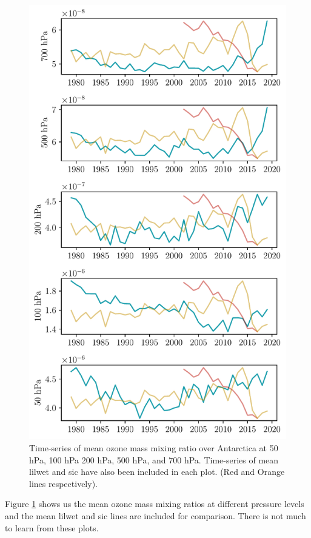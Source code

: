 \documentclass[../main.tex]{subfiles}
\begin{document}
\begin{figure}[hbt!]
    \centering
    \includegraphics{images/T2/timeseries_subplots/hres/ozone}
    \caption{Time-series of mean ozone mass mixing ratio over Antarctica at 50 hPa, 100 hPa 200 hPa, 500 hPa, and 700 hPa. Time-series of mean \gls{lilwet} and \gls{sic} have also been included in each plot. (Red and Orange lines respectively).}
    \label{fig:timeseries_o3_50}
\end{figure}

Figure \ref{fig:timeseries_o3_50} shows us the mean ozone mass mixing ratios at different pressure levels and the mean \gls{lilwet} and \gls{sic} lines are included for comparison. There is not much to learn from these plots.
\end{document}
